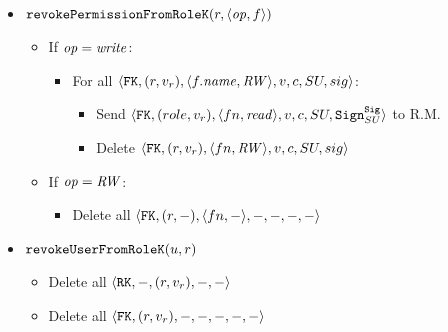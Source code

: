 {\begin{itemize}
        \item \( \revokePermissionFromRoleFK \)
        \begin{itemize}
            \item If \( \operation = \opwrite \):
            \begin{itemize}
                \item For all \( \pt{(\role, \rolev)}{\twoang{\file.\fname}{\opreadwrite}}{v}{c}{SU}{sig} \):
                \begin{itemize}
                    \item Send \( \pt{(role, \rolev)}{\twoang{fn}{\opread}}{v}{c}{SU}{\sig{SU}} \) to R.M.
                    \item Delete \( \pt{(\role, \rolev)}{\twoang{fn}{\opreadwrite}}{v}{c}{SU}{sig} \)
                \end{itemize}
            \end{itemize}
            \item If \( \operation = \opreadwrite \):
            \begin{itemize}
                \item Delete all \( \pt{(\role, -)}{\twoang{fn}{-}}{-}{-}{-}{-} \)
            \end{itemize}
        \end{itemize}

        \item \( \revokeUserFromRoleFK \)
        \begin{itemize}
            \item Delete all \( \rt{-}{( \role, \rolev )}{-}{-} \)
            \item Delete all \( \pt{( \role, \rolev )}{-}{-}{-}{-}{-} \)
        \end{itemize}


\end{itemize}}
